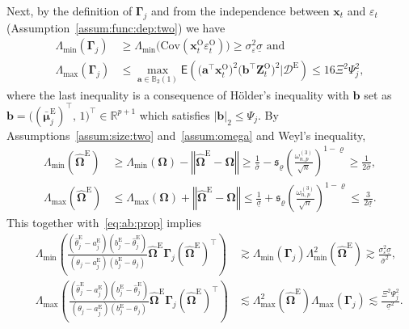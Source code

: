 \documentclass[11pt, a4paper]{article}
\newcommand{\mbf}{\mathbf}
\newcommand{\mc}{\mathcal}
\newcommand{\vep}{\varepsilon}
\renewcommand{\l}{\left}
\renewcommand{\r}{\right}
\def\wh{\widehat}
\newcommand{\cp}{\theta}
\newcommand{\E}[0]{\mathsf{E}}
\newcommand{\R}{\mathbb{R}}
\newcommand{\tE}{\text{E}}
\newcommand{\tO}{\text{O}}
\theoremstyle{definition}
\theoremstyle{definition}
\theoremstyle{definition}
\theoremstyle{definition}
\theoremstyle{definition}
\theoremstyle{remark}
\theoremstyle{definition}
\theoremstyle{definition}
\theoremstyle{definition}
\begin{document}
Next, by the definition of $\bm\Gamma_j$ and from the independence between $\mbf x_t$ and $\vep_t$ (Assumption~\ref{assum:func:dep:two}) we have 
\begin{subequations}
	\label{eq:gamma:eigval}
	\begin{align}
	\Lambda_{\min}(\bm\Gamma_j) &\ge \Lambda_{\min}\bigl(\mathrm{Cov}(\mbf x_t^{\tO} \varepsilon_t^{\tO})\bigr)\ge \sigma_{\varepsilon}^2 \underline{\sigma} \text{ \ and }    
	\\
	\Lambda_{\max}( \bm\Gamma_j) &\le \max_{\mbf a \in \mathbb{B}_2(1)} \E \l(\bigl(\mbf a^\top \mbf x_t^\tO\bigr)^2\bigl(\mbf b^\top\bm Z_t^\tO\bigr)^2\Big\vert \mc D^{\tE} \r) \le 16 \Xi^2 \Psi_j^2,
	\end{align}
\end{subequations}
where the last inequality is a consequence of H\"older's inequality with $\mbf b$ set as $\mbf b = \bigl((\bar{\bm\mu}^{\tE}_j)^{\top},\, 1\bigr)^\top\in\R^{p+1}$ which satisfies $\vert\mbf b\vert_2 \le \Psi_j$.
By Assumptions~\ref{assum:size:two} and~\ref{assum:omega} and Weyl's inequality,
\begin{subequations}
	\label{eq:omega:eigval}
	\begin{align}
	\Lambda_{\min}\l( \wh{\bm\Omega}^{\tE} \r) &\ge \Lambda_{\min}\l(\bm\Omega \r) - \l\Vert \wh{\bm\Omega}^{\tE} - \bm\Omega \r\Vert \ge \frac{1}{\bar{\sigma}} - \mathfrak{s}_\varrho \l( \frac{\omega^{(3)}_{n, p}}{\sqrt{n}} \r)^{1 - \varrho} \ge  \frac{1}{2\bar{\sigma}},\\
	\Lambda_{\max}\l( \wh{\bm\Omega}^{\tE} \r) &\le \Lambda_{\max}\l(\bm\Omega \r) + \l\Vert \wh{\bm\Omega}^{\tE} - \bm\Omega \r\Vert \le \frac{1}{\underline{\sigma}} + \mathfrak{s}_\varrho \l( \frac{\omega^{(3)}_{n, p}}{\sqrt{n}} \r)^{1 - \varrho} \le \frac{3}{2\underline{\sigma}}.
	\end{align}
\end{subequations}
This together with~\eqref{eq:ab:prop} implies
\begin{subequations}
	\label{eq:maxmin}
	\begin{align}
	&& \Lambda_{\min}\l(\tfrac{(\wh\cp^{\tE}_j - a^{\tE}_j)(b^{\tE}_j - \wh\cp^{\tE}_j)}{(\cp_j - a^{\tE}_j)(b^{\tE}_j - \cp_j)} \wh{\bm\Omega}^{\tE} \bm\Gamma_j \l(\wh{\bm\Omega}^{\tE}\r)^\top\r)&  \gtrsim \Lambda_{\min}(\bm\Gamma_j)\Lambda_{\min}^2\l( \wh{\bm\Omega}^{\tE} \r) \gtrsim \frac{\sigma_{\varepsilon}^2\underline{\sigma}}{\bar\sigma^2}, \\
	&& \Lambda_{\max}\l(\tfrac{(\wh\cp^{\tE}_j - a^{\tE}_j)(b^{\tE}_j - \wh\cp^{\tE}_j)}{(\cp_j - a^{\tE}_j)(b^{\tE}_j - \cp_j)} \wh{\bm\Omega}^{\tE} \bm\Gamma_j \l(\wh{\bm\Omega}^{\tE}\r)^\top \r) & \lesssim \Lambda_{\max}^2\l(\wh{\bm\Omega}^{\tE}\r) \Lambda_{\max}(\bm\Gamma_j) \lesssim \frac{\Xi^2 \Psi_j^2}{\underline \sigma^2}.
	\end{align}
\end{subequations}
\end{document}
